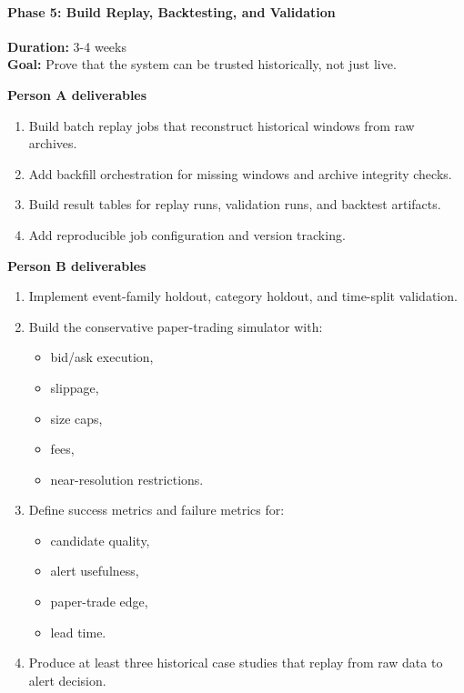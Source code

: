 \documentclass[
]{article}
\providecommand{\tightlist}{%
  \setlength{\itemsep}{0pt}\setlength{\parskip}{0pt}}
\begin{document}
\paragraph{Phase 5: Build Replay, Backtesting, and
Validation}\label{phase-5-build-replay-backtesting-and-validation}

\textbf{Duration:} 3-4 weeks\\
\textbf{Goal:} Prove that the system can be trusted historically, not
just live.

\textbf{Person A deliverables}

\begin{enumerate}
\def\labelenumi{\arabic{enumi}.}
\tightlist
\item
  Build batch replay jobs that reconstruct historical windows from raw
  archives.
\item
  Add backfill orchestration for missing windows and archive integrity
  checks.
\item
  Build result tables for replay runs, validation runs, and backtest
  artifacts.
\item
  Add reproducible job configuration and version tracking.
\end{enumerate}

\textbf{Person B deliverables}

\begin{enumerate}
\def\labelenumi{\arabic{enumi}.}
\tightlist
\item
  Implement event-family holdout, category holdout, and time-split
  validation.
\item
  Build the conservative paper-trading simulator with:

  \begin{itemize}
  \tightlist
  \item
    bid/ask execution,
  \item
    slippage,
  \item
    size caps,
  \item
    fees,
  \item
    near-resolution restrictions.
  \end{itemize}
\item
  Define success metrics and failure metrics for:

  \begin{itemize}
  \tightlist
  \item
    candidate quality,
  \item
    alert usefulness,
  \item
    paper-trade edge,
  \item
    lead time.
  \end{itemize}
\item
  Produce at least three historical case studies that replay from raw
  data to alert decision.
\end{enumerate}
\end{document}
